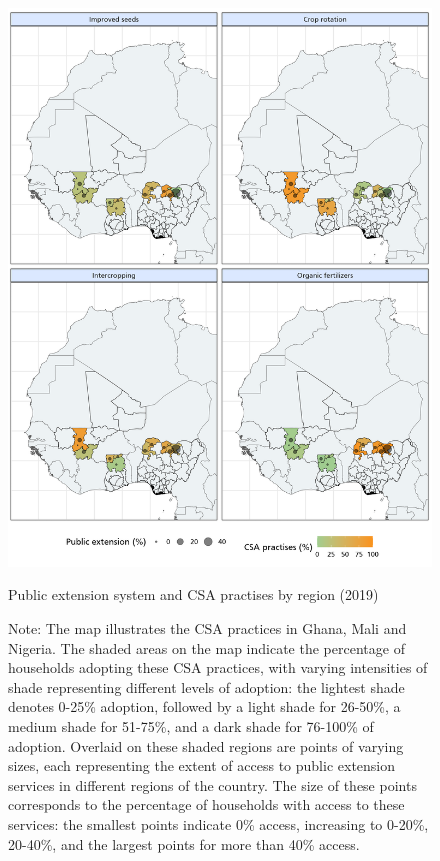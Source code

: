 \documentclass[
]{article}
\begin{document}
\newpage
\begin{figure}[H]
\centering
\includegraphics[scale=0.6]{"figures/map_public.png"}
\caption{Public extension system and CSA practises  by region (2019)}
\caption*{Note: The map illustrates the CSA practices in Ghana, Mali and Nigeria. The shaded areas on the map indicate the percentage of households adopting these CSA practices, with varying intensities of shade representing different levels of adoption: the lightest shade denotes 0-25\% adoption, followed by a light shade for 26-50\%, a medium shade for 51-75\%, and a dark shade for 76-100\% of adoption. Overlaid on these shaded regions are points of varying sizes, each representing the extent of access to public extension services in different regions of the country. The size of these points corresponds to the percentage of households with access to these services: the smallest points indicate 0\% access, increasing to 0-20\%, 20-40\%, and the largest points for more than 40\% access.}
\label{fig:map_1}
\end{figure}
\end{document}
